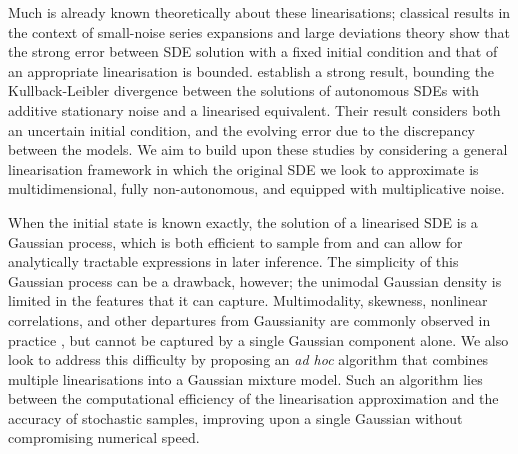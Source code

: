 Much is already known theoretically about these linearisations; classical results in the context of small-noise series expansions \citep{Blagoveshchenskii_1962_DiffusionProcessesDepending} and large deviations theory \citep{FreidlinWentzell_1998_RandomPerturbationsDynamical} show that the strong error between SDE solution with a fixed initial condition and that of an appropriate linearisation is bounded.
\citet{Sanz-AlonsoStuart_2017_GaussianApproximationsSmall} establish a strong result, bounding the Kullback-Leibler divergence between the solutions of autonomous SDEs with additive stationary noise and a linearised equivalent.
Their result considers both an uncertain initial condition, and the evolving error due to the discrepancy between the models.
We aim to build upon these studies by considering a general linearisation framework in which the original SDE we look to approximate is multidimensional, fully non-autonomous, and equipped with multiplicative noise.

When the initial state is known exactly, the solution of a linearised SDE is a Gaussian process, which is both efficient to sample from and can allow for analytically tractable expressions in later inference.
The simplicity of this Gaussian process can be a drawback, however; the unimodal Gaussian density is limited in the features that it can capture.
Multimodality, skewness, nonlinear correlations, and other departures from Gaussianity are commonly observed in practice \citep{SuraEtAl_2005_MultiplicativeNoiseNonGaussianity,BraccoEtAl_2000_VelocityProbabilityDensity,del-Castillo-Negrete_1998_AsymmetricTransportNonGaussian}, but cannot be captured by a single Gaussian component alone.
We also look to address this difficulty by proposing an \emph{ad hoc} algorithm that combines multiple linearisations into a Gaussian mixture model.
Such an algorithm lies between the computational efficiency of the linearisation approximation and the accuracy of stochastic samples, improving upon a single Gaussian without compromising numerical speed.

